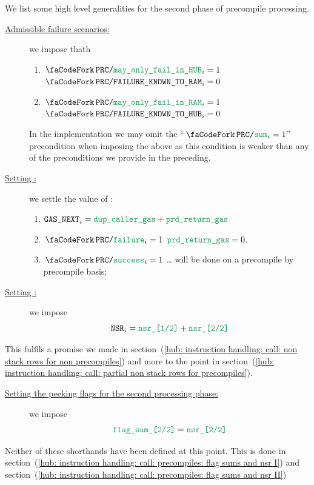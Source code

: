 \begin{center}
\end{center}
We list some high level generalities for the second phase of precompile processing. 
\begin{description}
	\item[\underline{Admissible failure scenarios:}]\label{hub: instruction handling: call: precompiles: generalities: admissible failure scenarios}
		we impose thath
		\begin{enumerate}
			\item \If $\scenPrecompileMayOnlyFailInHub _{i} = 1$ \Then $\scenPrcFailureKnownToRam _{i} = 0$
			\item \If $\scenPrecompileMayOnlyFailInRam _{i} = 1$ \Then $\scenPrcFailureKnownToHub _{i} = 0$
		\end{enumerate}
		\saNote{}
		In the implementation we may omit the ``$\scenPrecompileSum _{i} = 1$'' precondition when imposing the above
		as this condition is weaker than any of the preconditions we provide in the preceding.
	\item[\underline{Setting \gasNext{}:}] we settle the value of \gasNext{}:
		\begin{enumerate}
			\item $\gasNext_{i} = \locPrcCallerGas + \locPrcReturnGas$
			\item \If $\scenPrcFailure_{i} = 1$ \Then $\locPrcReturnGas = 0$.
			\item \If $\scenPrcSuccess_{i} = 1$ \Then \dots{} will be done on a precompile by precompile basis;
		\end{enumerate}
	\item[\underline{Setting \nonStackRows{}:}]
		we impose
		\[ \nonStackRows_{i} = \locFirstPhaseNsr + \locNsrPrecompilesSH \]
\end{description}
\saNote{} This fulfils a promise we made in
section~(\ref{hub: instruction handling: call: non stack rows for non precompiles}) and more to the point in
section~(\ref{hub: instruction handling: call: partial non stack rows for precompiles}).
\begin{description}
	\item[\underline{Setting the peeking flags for the second processing phase:}]
		we impose
		\[ \locFlagSumPrecompilesSH = \locNsrPrecompilesSH \]
\end{description} 
\saNote{} 
Neither of these shorthands have been defined at this point.
This is done in
section~(\ref{hub: instruction handling: call: precompiles: flag sums and nsr I}) and
section~(\ref{hub: instruction handling: call: precompiles: flag sums and nsr II})
